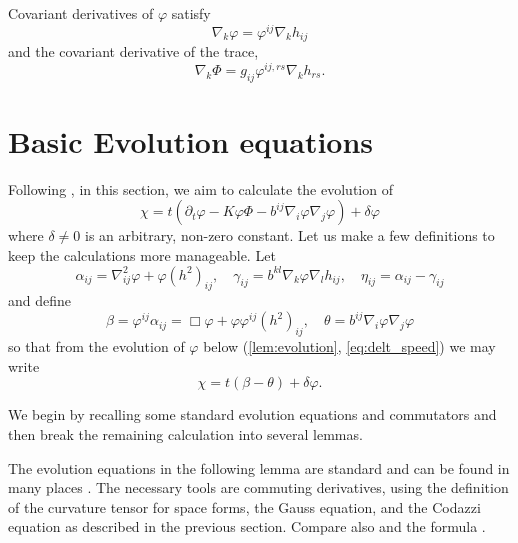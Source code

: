 \documentclass{amsart}
\begin{document}
Covariant derivatives of \(\varphi\) satisfy
\begin{equation}
\label{eq:delphi}
\nabla_k \varphi = \varphi^{ij} \nabla_k h_{ij}
\end{equation}
and the covariant derivative of the trace,
\begin{equation}
\label{eq:delPhi}
\nabla_k \Phi = g_{ij} \varphi^{ij,rs} \nabla_k h_{rs}.
\end{equation}

\section{Basic Evolution equations}

Following \cite{MR1296393, MR1100812, MR1316556, MR1480081}, in this section, we aim to calculate the evolution of
\[
\chi =t(\partial_t \varphi - K \varphi \Phi - b^{ij} \nabla_i \varphi \nabla_j \varphi) +\delta\varphi
\]
where \(\delta \ne 0\) is an arbitrary, non-zero constant. Let us make a few definitions to keep the calculations more manageable. Let
\[
\alpha_{ij} = \nabla^2_{ij} \varphi + \varphi(h^2)_{ij}, \quad \gamma_{ij} = b^{kl} \nabla_k \varphi \nabla_l h_{ij}, \quad \eta_{ij} = \alpha_{ij} - \gamma_{ij}
\]
and define
\[
\beta = \varphi^{ij} \alpha_{ij} = \Box\varphi + \varphi \varphi^{ij}(h^2)_{ij}, \quad \theta =  b^{ij} \nabla_i \varphi \nabla_j \varphi
\]
so that from the evolution of \(\varphi\) below (\cref{lem:evolution}, \cref{eq:delt_speed}) we may write
\[
\chi = t(\beta - \theta) + \delta\varphi.
\]

We begin by recalling some standard evolution equations and commutators and then break the remaining calculation into several lemmas.

The evolution equations in the following lemma are standard and can be found in many places \cite{MR1296393,MR1100812, MR1316556, MR892052, MR1480081}. The necessary tools are commuting derivatives, using the definition of the curvature tensor for space forms, the Gauss equation, and the Codazzi equation as described in the previous section. Compare also \cite[p.~94-95]{Gerhardt:/2006} and the formula \cite[eq.~(6.17)]{Gerhardt:01/1996}.
\end{document}
